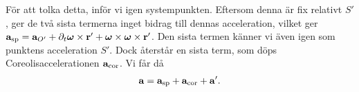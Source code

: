 För att tolka detta, inför vi igen systempunkten. Eftersom denna är fix relativt $S'$, ger de två sista termerna inget bidrag till dennas acceleration, vilket ger $\vb{a}_{\text{sp}} = \vb{a}_{O'} + \partial_{t}\vb*{\omega}\times\vb{r}' + \vb*{\omega}\times\vb*{\omega}\times\vb{r}'$. Den sista termen känner vi även igen som punktens acceleration $S'$. Dock återstår en sista term, som döps Coreolisaccelerationen $\vb{a}_{\text{cor}}$. Vi får då
\begin{align*}
	\vb{a} = \vb{a}_{\text{sp}} + \vb{a}_{\text{cor}} + \vb{a}'.
\end{align*}